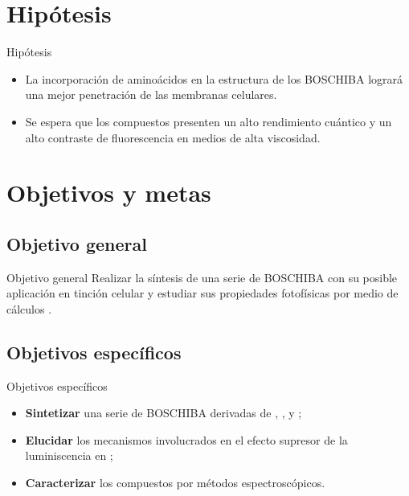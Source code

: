 \documentclass[%
spanish,
mexico]{beamer}
\begin{document}
\section{Hipótesis}
\begin{frame}{Hipótesis}
    \begin{itemize}
        \item La incorporación de aminoácidos en la estructura de los \gls{BOSCHIBA} logrará una mejor penetración de las membranas celulares.
        \item Se espera que los compuestos presenten un alto rendimiento cuántico y un alto contraste de fluorescencia en medios de alta viscosidad.
    \end{itemize}
\end{frame}

\section{Objetivos y metas}
\subsection{Objetivo general}
\begin{frame}{Objetivo general}
    Realizar la síntesis de una serie de \gls{BOSCHIBA} con su posible aplicación en tinción celular y estudiar sus propiedades fotofísicas por medio de cálculos \insilico{}.
\end{frame}

\subsection{Objetivos específicos}
\begin{frame}{Objetivos específicos}
    \begin{itemize}
        \item \textbf{Sintetizar} una serie de \gls{BOSCHIBA} derivadas de , ,  y ;
        \item \textbf{Elucidar} los mecanismos involucrados en el efecto supresor de la luminiscencia en ;
        \item \textbf{Caracterizar} los compuestos por métodos espectroscópicos.
    \end{itemize}
\end{frame}
\end{document}
